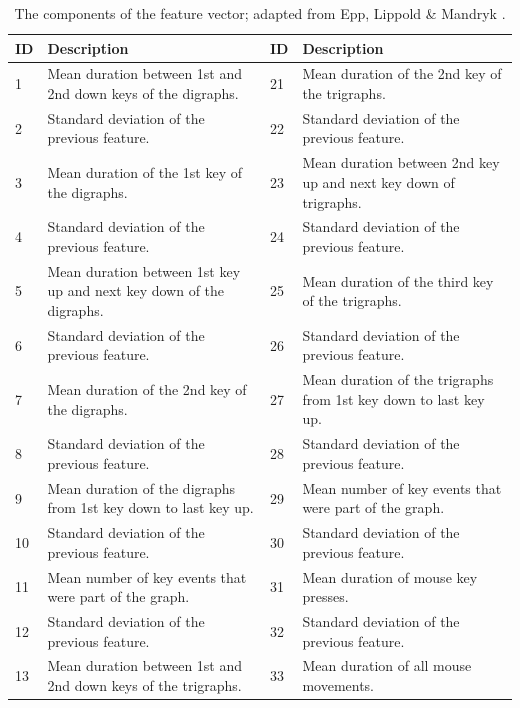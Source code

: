 \documentclass[a4paper,twoside]{article}
\begin{document}
\begin{table}[h!tb]
\centering
\caption{The components of the feature vector; adapted from Epp, Lippold \& Mandryk \cite{epp2011identifying}.}
\label{tab_features}
    \begin{tabular}{ | l |p{} || l | p{} | }
    \hline
    ID          & Description           & ID               & Description  \\
    \hline
    1 & Mean duration between 1st and 2nd down keys of the digraphs.  & 21 & Mean duration of the 2nd key of the trigraphs.\\
    \hline
    2 & Standard deviation of the previous feature.                   & 22 & Standard deviation of the previous feature.\\
    \hline
    3 & Mean duration of the 1st key of the digraphs.                 & 23 & Mean duration between 2nd key up and next key down of trigraphs.\\
    \hline
    4 & Standard deviation of the previous feature.                   & 24 & Standard deviation of the previous feature.\\
    \hline
    5 & Mean duration between 1st key up and next key down of the digraphs. & 25 & Mean duration of the third key of the trigraphs.\\
    \hline
    6 & Standard deviation of the previous feature. & 26 & Standard deviation of the previous feature.\\
    \hline
    7 & Mean duration of the 2nd key of the digraphs. & 27 & Mean duration of the trigraphs from 1st key down to last key up.\\
    \hline
    8 & Standard deviation of the previous feature. & 28 & Standard deviation of the previous feature.\\
    \hline
    9 & Mean duration of the digraphs from 1st key down to last key up. & 29 & Mean number of key events that were part of the graph.\\
    \hline
    10 & Standard deviation of the previous feature. & 30 & Standard deviation of the previous feature.\\
    \hline
    11 & Mean number of key events that were part of the graph. & 31 & Mean duration of mouse key presses.\\
    \hline
    12 & Standard deviation of the previous feature. & 32 & Standard deviation of the previous feature.\\
    \hline
    13 & Mean duration between 1st and 2nd down keys of the trigraphs. & 33 & Mean duration of all mouse movements.\\

\end{tabular}
\end{table}
\end{document}
